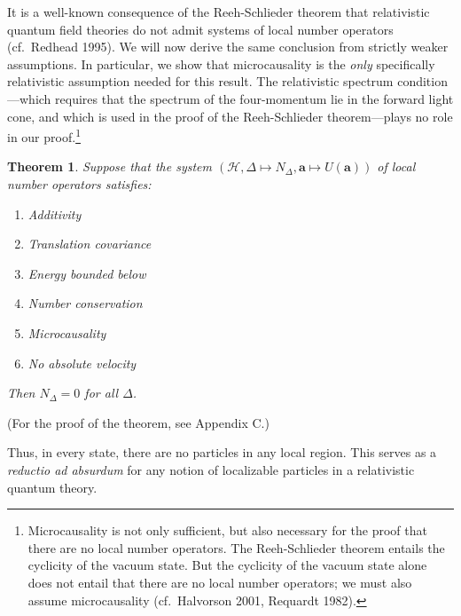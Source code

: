 \documentclass[12pt]{article}
\newtheorem{thm}{Theorem}
\theoremstyle{remark}
\newcommand{\hil}[1]{\mathcal{#1}}
\begin{document}
It is a well-known consequence of the Reeh-Schlieder theorem that
relativistic quantum field theories do not admit systems of local
number operators (cf.~Redhead 1995).  We will now derive the same
conclusion from strictly weaker assumptions.  In particular, we show
that microcausality is the \emph{only} specifically relativistic
assumption needed for this result.  The relativistic spectrum
condition---which requires that the spectrum of the four-momentum lie
in the forward light cone, and which is used in the proof of the
Reeh-Schlieder theorem---plays no role in our
proof.\footnote{Microcausality is not only sufficient, but also
  necessary for the proof that there are no local number operators.
  The Reeh-Schlieder theorem entails the cyclicity of the vacuum
  state.  But the cyclicity of the vacuum state alone does not entail
  that there are no local number operators; we must also assume
  microcausality (cf.~Halvorson 2001, Requardt 1982).}

\begin{thm} Suppose that the system $(\hil{H},\Delta \mapsto
  N_{\Delta},\mathbf{a}\mapsto U(\mathbf{a}))$ of local number
  operators satisfies:
 \begin{enumerate}
  \item Additivity
  \item Translation covariance \label{numbercovariance}
   \item Energy bounded below 
  \item Number conservation \label{numberconservation}
 \item Microcausality
 \item No absolute velocity
\end{enumerate}
Then $N_{\Delta}=0$ for all $\Delta$.  \label{rqft} \end{thm}
\noindent (For the proof of the theorem, see Appendix C.)  

Thus, in every state, there are no particles in any local region.
This serves as a \emph{reductio ad absurdum} for any notion of
localizable particles in a relativistic quantum theory.
\end{document}
